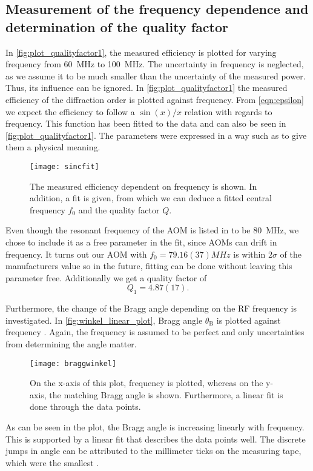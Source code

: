 \subsection{Measurement of the frequency
	dependence and determination of the
	quality factor}\label{frequency_dependence}
In \autoref{fig:plot_qualityfactor1}, the measured efficiency is plotted for varying frequency \frf from \SI{60}{MHz} to \SI{100}{MHz}. The uncertainty in frequency is neglected, as we assume it to be much smaller than the uncertainty of the measured power. Thus, its influence can be ignored. In \autoref{fig:plot_qualityfactor1} the measured efficiency of the  diffraction order is plotted against frequency. From \autoref{eqn:epsilon} we expect the efficiency to follow a $\sin(x)/x$ relation with regards to frequency. This function has been fitted to the data and can also be seen in \autoref{fig:plot_qualityfactor1}. The parameters were expressed in a way such as to give them a physical meaning. 
\begin{figure}[H]
	\centering
	\texttt{[image: sincfit]}
	\caption{The measured efficiency dependent on frequency is shown. In addition, a fit is given, from which we can deduce a fitted central frequency $f_0$ and the quality factor $Q$.} 
	\label{fig:plot_qualityfactor1}
\end{figure}
Even though the resonant frequency of the AOM is listed in \autocite{bragg} to be \SI{80}{MHz}, we chose to include it as a free parameter in the fit, since AOMs can drift in frequency. It turns out our AOM with $f_0 = 79.16(37)\unit{MHz}$ is within $2 \sigma$ of the manufacturers value so in the future, fitting can be done without leaving this parameter free. Additionally we get a quality factor of
$$Q_1=4.87(17) .$$

Furthermore, the change of the Bragg angle depending on the RF frequency is investigated. In \autoref{fig:winkel_linear_plot}, Bragg angle $\theta_\mathrm{B}$ is plotted against frequency \frf. Again, the frequency is assumed to be perfect and only uncertainties from determining the angle matter.
\begin{figure}[H]
	\centering
	\texttt{[image: braggwinkel]}
	\caption{On the x-axis of this plot, frequency is plotted, whereas on the y-axis, the matching Bragg angle is shown. Furthermore, a linear fit is done through the data points.} 
	\label{fig:winkel_linear_plot}
\end{figure}

As can be seen in the plot, the Bragg angle is increasing linearly with frequency. This is supported by a linear fit that describes the data points well. The discrete jumps in angle can be attributed to the millimeter ticks on the measuring tape, which were the smallest . 


